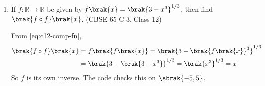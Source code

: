 \begin{enumerate}[label=\thesubsection.\arabic*., ref=\thesubsection.\theenumi]
\solution The vectors are
\begin{align}
\vec{a} = \myvec{2\\-1\\2},\quad \vec{b} = \myvec{5\\-3\\-4}
\end{align}
\begin{align}
\vec{a}^{\top}\vec{b} = 10+3-8 = 5,\quad
\norm{\vec{a}} = \sqrt{4+1+4} = 3,\quad
\norm{\vec{b}} = \sqrt{25+9+16} = 5\sqrt{2}
\end{align}
From \eqref{eq:c12-proj}, the required ratio is
\begin{align}
\frac{\vec{a}^{\top}\vec{b}/\norm{\vec{b}}}{\vec{a}^{\top}\vec{b}/\norm{\vec{a}}}
= \frac{\norm{\vec{a}}}{\norm{\vec{b}}} = \frac{3}{5\sqrt{2}} = \frac{3\sqrt{2}}{10}
\end{align}
 
For the alternate question, $\vec{c}\perp\vec{d}$ gives
\begin{align}
\vec{c}^{\top}\vec{d} = \brak{\hat{\vec{a}}+2\hat{\vec{b}}}^{\top}\brak{5\hat{\vec{a}}-4\hat{\vec{b}}}
= 5\hat{\vec{a}}^{\top}\hat{\vec{a}}+6\hat{\vec{a}}^{\top}\hat{\vec{b}}-8\hat{\vec{b}}^{\top}\hat{\vec{b}} = 0
\end{align}
From \eqref{eq:c12-unit},
\begin{align}
5+6\cos\theta-8 = 0 \implies \cos\theta = \frac{1}{2}
\implies \theta = \frac{\pi}{3}
\end{align}
 
\begin{center}
\end{center}
 
\item If $f:\mathbb{R}\to\mathbb{R}$ be given by $f\brak{x}=\brak{3-x^3}^{1/3}$, then find $\brak{f\circ f}\brak{x}$.
\hfill (CBSE 65-C-3, Class 12)
 
\solution From \eqref{eq:c12-comp-fn},
\begin{align}
\brak{f\circ f}\brak{x} &= f\brak{f\brak{x}} = \brak{3-\brak{f\brak{x}}^3}^{1/3}
\\
&= \brak{3-\brak{3-x^3}}^{1/3} = \brak{x^3}^{1/3} = x
\end{align}
So $f$ is its own inverse. The code checks this on $\sbrak{-5,5}$.
 
\begin{center}
\end{center}
 

\end{enumerate}
